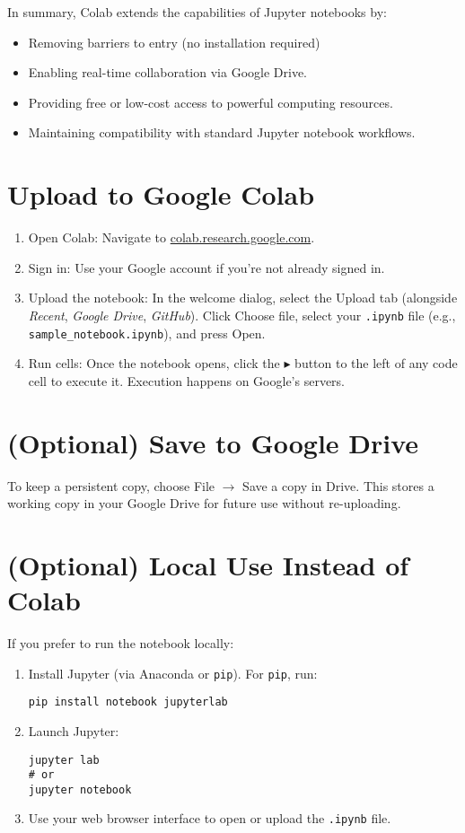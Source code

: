\documentclass[11pt]{article}
\begin{document}
In summary, Colab extends the capabilities of Jupyter notebooks by:
\begin{itemize}
\item Removing barriers to entry (no installation required)
\item Enabling real-time collaboration via Google Drive.
    \item Providing free or low-cost access to powerful computing resources.
    \item Maintaining compatibility with standard Jupyter notebook workflows.
\end{itemize}

\section{Upload to Google Colab}
\begin{enumerate}[label=Step \arabic*:, leftmargin=*, itemsep=0.6em]
  \item Open Colab: Navigate to
    \href{https://colab.research.google.com}{colab.research.google.com}.    
  \item Sign in: Use your Google account if you're not already signed
    in.    
  \item Upload the notebook: In the welcome dialog, select the Upload
    tab (alongside \emph{Recent}, \emph{Google Drive},
    \emph{GitHub}). Click Choose file, select your \texttt{.ipynb}
    file (e.g., \texttt{sample\_notebook.ipynb}), and press Open.    
  \item Run cells: Once the notebook opens, click the $\blacktriangleright$ 
    button to the left of any code cell to execute it. Execution
    happens on Google's servers.    
\end{enumerate}

\section{(Optional) Save to Google Drive}
To keep a persistent copy, choose File $\rightarrow$ Save a copy in
Drive. This stores a working copy in your Google Drive for future use
without re-uploading.

\section{(Optional) Local Use Instead of Colab}
If you prefer to run the notebook locally:
\begin{enumerate}[label=\alph*), leftmargin=*, itemsep=0.4em]
  \item Install Jupyter (via Anaconda or \texttt{pip}). For \texttt{pip}, run:
\begin{lstlisting}[style=cmd]
pip install notebook jupyterlab
\end{lstlisting}
  \item Launch Jupyter:
\begin{lstlisting}[style=cmd]
jupyter lab
# or
jupyter notebook
\end{lstlisting}
  \item Use your web browser interface to open or upload the \texttt{.ipynb} file.
\end{enumerate}
\end{document}
